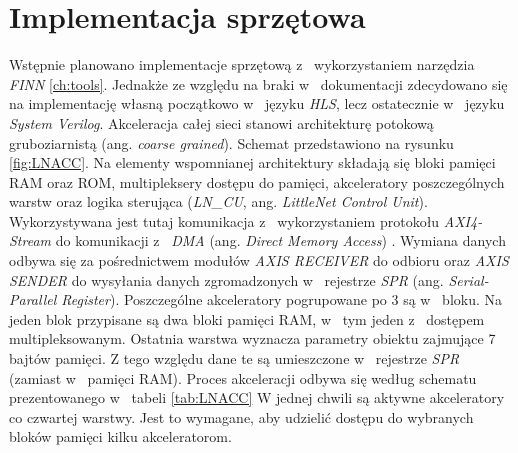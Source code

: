 \section{Implementacja sprzętowa}
Wstępnie planowano implementacje sprzętową z~ wykorzystaniem narzędzia \emph{FINN} \ref{ch:tools}.
Jednakże ze względu na braki w~ dokumentacji zdecydowano się na implementację własną początkowo w~ języku \emph{HLS}, lecz ostatecznie w~ języku \emph{System Verilog}.
Akceleracja całej sieci stanowi architekturę potokową gruboziarnistą (ang. \emph{coarse grained}).
Schemat przedstawiono na rysunku \ref{fig:LNACC}.
Na elementy wspomnianej architektury składają się bloki pamięci RAM oraz ROM, multipleksery dostępu do pamięci, akceleratory poszczególnych warstw oraz logika sterująca (\emph{LN\_CU}, ang. \emph{LittleNet Control Unit}).
Wykorzystywana jest tutaj komunikacja z~ wykorzystaniem protokołu \emph{AXI4-Stream} \cite{axis} do komunikacji z~ \emph{DMA} (ang. \emph{Direct Memory Access}) \cite{dma}.
Wymiana danych odbywa się za pośrednictwem  modułów \emph{AXIS RECEIVER} do odbioru oraz \emph{AXIS SENDER} do wysyłania danych zgromadzonych w~ rejestrze \emph{SPR} (ang. \emph{Serial-Parallel Register}).
Poszczególne akceleratory pogrupowane po 3 są w~ bloku. 
Na jeden blok przypisane są dwa bloki pamięci RAM, w~ tym jeden z~ dostępem  multipleksowanym.
Ostatnia warstwa wyznacza parametry obiektu zajmujące 7 bajtów pamięci.
Z tego względu dane te są umieszczone w~ rejestrze \emph{SPR} (zamiast w~ pamięci RAM).
Proces akceleracji odbywa się według schematu prezentowanego w~ tabeli \ref{tab:LNACC}
W jednej chwili są aktywne akceleratory co czwartej warstwy.
Jest to wymagane, aby udzielić dostępu do wybranych bloków pamięci kilku akceleratorom.

